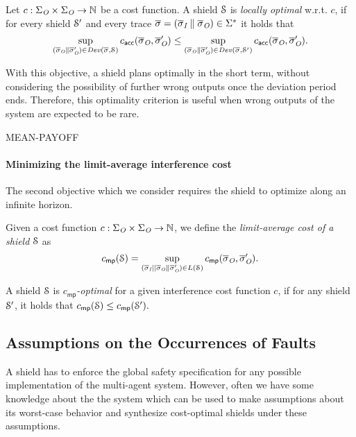 \begin{defn}\label{def:locally-optimal}
Let $c : \Sigma_{\textit{O}} \times \Sigma_{\textit{O}} \to \mathbb{N}$ be a cost function. A shield $\mathcal{S}$ is \emph{locally optimal} w.r.t. $c$, if for every shield $\mathcal{S}'$ and every trace $\overline\sigma=(\overline\sigma_{\textit{I}}\parallel\overline\sigma_{\textit{O}})\in \Sigma^*$ it holds that
$$\sup_{(\overline\sigma_{\textit{O}}\parallel\overline\sigma_{\textit{O}}')\in\mathit{Dev}(\overline\sigma,\mathcal{S})} c_{\mathsf{acc}}(\overline\sigma_{\textit{O}},\overline\sigma_{\textit{O}}') \leq \sup_{(\overline\sigma_{\textit{O}}\parallel\overline\sigma_{\textit{O}}')\in\mathit{Dev}(\overline\sigma,\mathcal{S}')} c_{\mathsf{acc}}(\overline\sigma_{\textit{O}},\overline\sigma_{\textit{O}}').$$
\end{defn}
With this objective, a shield plans optimally in the short term, without considering the possibility of further wrong outputs once the deviation period ends. Therefore, this optimality criterion is useful when wrong outputs of the system are expected to be rare.

\iftrue MEAN-PAYOFF
\paragraph*{Minimizing the limit-average interference cost}
The second objective which we consider requires the shield to optimize along an infinite horizon.

\begin{defn}\label{def:mp-optimal}
Given a cost function $c : \Sigma_{\textit{O}} \times \Sigma_{\textit{O}} \to \mathbb{N}$, we define the \emph{limit-average cost of a shield} $\mathcal{S}$ as$$c_{\mathsf{mp}}(\mathcal{S}) = \sup_{(\overline\sigma_{\textit{I}} || \overline\sigma_{\textit{O}}\parallel\overline\sigma_{\textit{O}}') \in L( \mathcal{S})}c_{\mathsf{mp}}(\overline\sigma_{\textit{O}},\overline\sigma_{\textit{O}}').$$
\end{defn}
\begin{defn}
A shield $\mathcal{S}$ is \emph{$c_{\mathsf{mp}}$-optimal} for a given interference cost function $c$, if for any shield $\mathcal{S}'$, it holds that
$c_{\mathsf{mp}}(\mathcal{S}) \leq c_{\mathsf{mp}}(\mathcal{S}').$
\end{defn}
\fi


\subsection{Assumptions on the Occurrences of Faults}\label{sec_assumptions}

A shield has to enforce the global safety specification for any possible  implementation of the multi-agent system.
However, often we have some knowledge about the the system which
can be used to make assumptions about its worst-case behavior and synthesize
cost-optimal shields under these assumptions.


